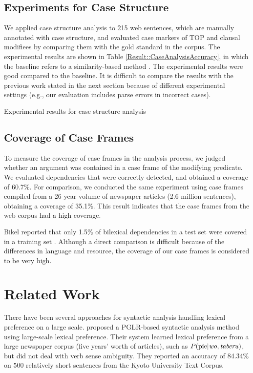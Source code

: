 \documentclass[english]{jnlp_1.4_rep}
\begin{document}
\subsection{Experiments for Case Structure}

We applied case structure analysis to 215 web sentences, which are
manually annotated with case structure, and evaluated case markers of 
TOP and clausal modifiees by comparing them with the gold standard
in the corpus. The experimental results are shown in Table
\ref{Result::CaseAnalysisAccuracy}, in which the baseline refers to a
similarity-based method \cite{Kawahara2002e}.
The experimental results were good compared to the baseline. It
is difficult to compare the results with the previous work stated in the
next section because of different experimental settings (e.g., our
evaluation includes parse errors in incorrect cases).

\begin{table}[b]
  \caption{Experimental results for case structure analysis}
  \label{Result::CaseAnalysisAccuracy}

\end{table}


\subsection{Coverage of Case Frames}

To measure the coverage of case frames in the analysis process, we
judged whether an argument was contained in a case frame of the
modifying predicate. We evaluated dependencies that were correctly
detected, and obtained a coverage of 60.7\%. For comparison, we conducted
the same experiment using case frames compiled from a 26-year volume of
newspaper articles (2.6 million sentences), obtaining a coverage of
35.1\%. This result indicates that the case frames from the web corpus
had a high coverage.

Bikel reported that only 1.5\% of bilexical dependencies in a test set
were covered in a training set \cite{Bikel2004}. Although a direct
comparison is difficult because of the differences in language and
resource, the coverage of our case frames is considered to be very high.


\section{Related Work}

There have been several approaches for syntactic analysis handling
lexical preference on a large scale.  proposed a PGLR-based
syntactic analysis method using large-scale lexical preference. Their system learned lexical preference from a large
newspaper corpus (five years' worth of articles), such as $P(\mbox{pie}|\mbox
{\textit{wo}}, \mbox{\textit{taberu}})$, but did not deal with verb
sense ambiguity. They reported an accuracy of 84.34\% on 500 relatively short
sentences from the Kyoto University Text Corpus.
\end{document}
